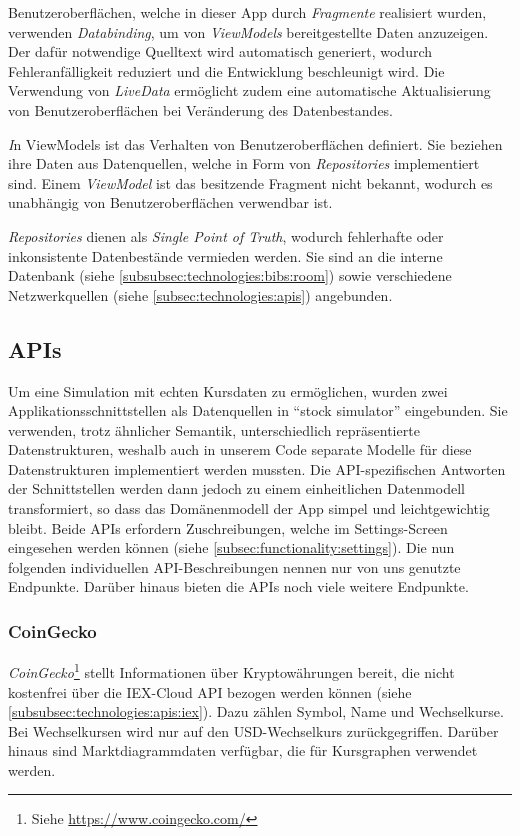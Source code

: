 \documentclass[a4paper]{article}
\begin{document}
Benutzeroberflächen, welche in dieser App durch \textit{Fragmente} realisiert wurden, verwenden \textit{Databinding}, um von \textit{ViewModels} bereitgestellte Daten anzuzeigen.
Der dafür notwendige Quelltext wird automatisch generiert, wodurch Fehleranfälligkeit reduziert und die Entwicklung beschleunigt wird.
Die Verwendung von \textit{LiveData} ermöglicht zudem eine automatische Aktualisierung von Benutzeroberflächen bei Veränderung des Datenbestandes.

\textit In {ViewModels} ist das Verhalten von Benutzeroberflächen definiert. Sie beziehen ihre Daten aus Datenquellen, welche in Form von \textit{Repositories} implementiert sind.
Einem \textit{ViewModel} ist das besitzende Fragment nicht bekannt, wodurch es unabhängig von Benutzeroberflächen verwendbar ist.

\textit{Repositories} dienen als \textit{Single Point of Truth}, wodurch fehlerhafte oder inkonsistente Datenbestände vermieden werden.
Sie sind an die interne Datenbank (siehe \autoref{subsubsec:technologies:bibs:room}) sowie verschiedene Netzwerkquellen (siehe \autoref{subsec:technologies:apis}) angebunden.


\subsection{APIs}
\label{subsec:technologies:apis}
Um eine Simulation mit echten Kursdaten zu ermöglichen, wurden zwei Applikationsschnittstellen als Datenquellen in ``stock simulator'' eingebunden.
Sie verwenden, trotz ähnlicher Semantik, unterschiedlich repräsentierte Datenstrukturen, weshalb auch in unserem Code separate Modelle für diese Datenstrukturen implementiert werden mussten.
Die API-spezifischen Antworten der Schnittstellen werden dann jedoch zu einem einheitlichen Datenmodell transformiert, so dass das Domänenmodell der App simpel und leichtgewichtig bleibt.
Beide APIs erfordern Zuschreibungen, welche im Settings-Screen eingesehen werden können (siehe \autoref{subsec:functionality:settings}).
Die nun folgenden individuellen API-Beschreibungen nennen nur von uns genutzte Endpunkte. Darüber hinaus bieten die APIs noch viele weitere Endpunkte.


\subsubsection{CoinGecko}
\label{subsubsec:technologies:apis:coingecko}
\textit{CoinGecko}\footnote{Siehe \url{https://www.coingecko.com/}} stellt Informationen über Kryptowährungen bereit, die nicht kostenfrei über die IEX-Cloud API bezogen werden können (siehe \autoref{subsubsec:technologies:apis:iex}).
Dazu zählen Symbol, Name und Wechselkurse.
Bei Wechselkursen wird nur auf den USD-Wechselkurs zurückgegriffen.
Darüber hinaus sind Marktdiagrammdaten verfügbar, die für Kursgraphen verwendet werden.
\end{document}
